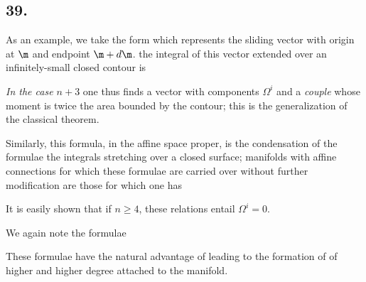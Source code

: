 \subsection*{39.}

As an example, we take the form
which represents the sliding vector with origin at $\m$ and endpoint $\m + d\m$. the integral of this vector extended over an infinitely-small closed contour is

\textit{In the case $n+3$} one thus finds a vector with components $\Omega^i$ and a \textit{couple} whose moment is twice the area bounded by the contour; this is the generalization of the classical theorem.

Similarly,
this formula, in the affine space proper, is the condensation of the formulae
the integrals stretching over a closed surface; manifolds with affine connections for which these formulae are carried over without further modification are those for which one has

It is easily shown that if $n\geq 4$, these relations entail $\Omega^i=0$.

We again note the formulae

These formulae have the natural advantage of leading to the formation of  of higher and higher degree attached to the manifold.
